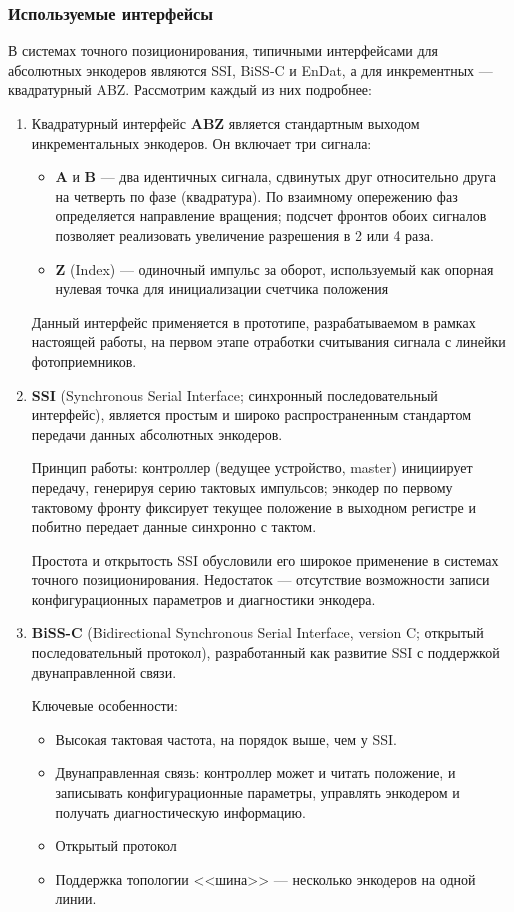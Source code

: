 \subsubsection{Используемые интерфейсы}

В системах точного позиционирования, типичными интерфейсами для абсолютных энкодеров являются SSI, BiSS‑C и EnDat, а для инкрементных --- квадратурный ABZ. Рассмотрим каждый из них подробнее:

\begin{enumerate}
\item Квадратурный интерфейс \textbf{ABZ} является стандартным выходом инкрементальных энкодеров. Он включает три сигнала:
\begin{itemize}
\item \textbf{A} и \textbf{B} --- два идентичных сигнала, сдвинутых друг относительно друга на четверть по фазе (квадратура). По взаимному опережению фаз определяется направление вращения; подсчет фронтов обоих сигналов позволяет реализовать увеличение разрешения в 2 или 4 раза.
\item \textbf{Z} (Index) --- одиночный импульс за оборот, используемый как опорная нулевая точка для инициализации счетчика положения
\end{itemize}

Данный интерфейс применяется в прототипе, разрабатываемом в рамках настоящей работы, на первом этапе отработки считывания сигнала с линейки фотоприемников.

\item \textbf{SSI} (Synchronous Serial Interface; синхронный последовательный интерфейс), является простым и широко распространенным стандартом передачи данных абсолютных энкодеров.

Принцип работы: контроллер (ведущее устройство, master) инициирует передачу, генерируя серию тактовых импульсов; энкодер по первому тактовому фронту фиксирует текущее положение в выходном регистре и побитно передает данные синхронно с тактом.

Простота и открытость SSI обусловили его широкое применение в системах точного позиционирования. Недостаток --- отсутствие возможности записи конфигурационных параметров и диагностики энкодера.

\item \textbf{BiSS-C} (Bidirectional Synchronous Serial Interface, version C; открытый последовательный протокол), разработанный как развитие SSI с поддержкой двунаправленной связи.

Ключевые особенности:
\begin{itemize}
\item Высокая тактовая частота, на порядок выше, чем у SSI.
\item Двунаправленная связь: контроллер может и читать положение, и записывать конфигурационные параметры, управлять энкодером и получать диагностическую информацию.
\item Открытый протокол
\item Поддержка топологии <<шина>> --- несколько энкодеров на одной линии.
\end{itemize}


\end{enumerate}
